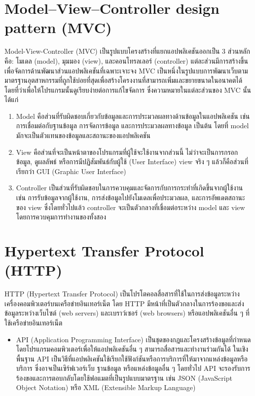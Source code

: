 \section{Model–View–Controller design pattern (MVC)}
Model-View-Controller (MVC) เป็นรูปแบบโครงสร้างที่แยกแอปพลิเคชันออกเป็น 3 ส่วนหลักคือ: โมเดล (model), มุมมอง (view), 
และคอนโทรลเลอร์ (controller) แต่ละส่วนมีการสร้างขึ้นเพื่อจัดการด้านพัฒนาส่วนแอปพลิเคชันที่เฉพาะเจาะจง MVC 
เป็นหนึ่งในรูปแบบการพัฒนาเว็บตามมาตรฐานอุตสาหกรรมที่ถูกใช้บ่อยที่สุดเพื่อสร้างโครงงานที่สามารถเพิ่มและขยายขนาดในอนาคตได้ 
โดยที่ว่าเพื่อให้โปรแกรมนั้นดูเรียบง่ายต่อการแก้ไขจัดการ ซึ่งความหมายในแต่ละส่วนของ MVC นั้นได้แก่ 
\begin{enumerate}
  \item Model คือส่วนที่รับผิดชอบเกี่ยวกับข้อมูลและการประมวลผลทางด้านข้อมูลในแอปพลิเคชัน เช่น การเชื่อมต่อกับฐานข้อมูล การจัดการข้อมูล 
  และการประมวลผลทางข้อมูล เป็นต้น โดยที่ model มักจะเป็นตัวแทนของข้อมูลและสถานะของแอปพลิเคชัน
  \item View คือส่วนที่จะเป็นหน้าตาของโปรแกรมที่ผู้ใช้จะใช้งานจากส่วนนี้ ไม่ว่าจะเป็นการกรอกข้อมูล, ดูผลลัพธ์ หรือการมีปฏิสัมพันธ์กับผู้ใช้ 
  (User Interface) view จริง ๆ แล้วก็คือส่วนที่เรียกว่า GUI (Graphic User Interface) 
  \item Controller เป็นส่วนที่รับผิดชอบในการควบคุมและจัดการกับการกระทำที่เกิดขึ้นจากผู้ใช้งาน เช่น การรับข้อมูลจากผู้ใช้งาน, 
  การส่งข้อมูลไปยังโมเดลเพื่อประมวลผล, และการอัพเดตสถานะของ view ซึ่งโดยทั่วไปแล้ว controller จะเป็นตัวกลางที่เชื่อมต่อระหว่าง model 
  และ view โดยการควบคุมการทำงานของทั้งสอง 
\end{enumerate}

\section{Hypertext Transfer Protocol (HTTP)}
HTTP (Hypertext Transfer Protocol) เป็นโปรโตคอลสื่อสารที่ใช้ในการส่งข้อมูลระหว่างเครื่องคอมพิวเตอร์บนเครือข่ายอินเทอร์เน็ต โดย HTTP 
มีหน้าที่เป็นตัวกลางในการร้องขอและส่งข้อมูลระหว่างเว็บไซต์ (web servers) และเบราว์เซอร์ (web browsers) หรือแอปพลิเคชันอื่น ๆ 
ที่ใช้เครือข่ายอินเทอร์เน็ต 
\begin{itemize}
  \item API (Application Programming Interface) เป็นชุดของกฎและโครงสร้างข้อมูลที่กำหนดโดยโปรแกรมคอมพิวเตอร์เพื่อให้แอปพลิเคชันอื่น ๆ 
  สามารถสื่อสารและทำงานร่วมกันได้ ในเชิงพื้นฐาน API เป็นวิธีที่แอปพลิเคชันใช้เรียกใช้ฟังก์ชันหรือการบริการที่ให้มาจากแหล่งข้อมูลหรือบริการ
  ซึ่งอาจเป็นเซิร์ฟเวอร์เว็บ ฐานข้อมูล หรือแหล่งข้อมูลอื่น ๆ โดยทั่วไป API จะรองรับการร้องขอและการตอบกลับโดยใช้ฟอแมตที่เป็นรูปแบบมาตรฐาน เช่น 
  JSON (JavaScript Object Notation) หรือ XML (Extensible Markup Language) 
\end{itemize}

